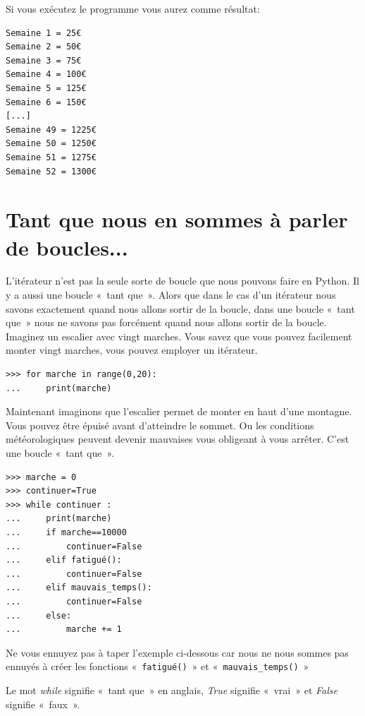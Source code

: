Si vous exécutez le programme vous aurez comme résultat:

\begin{Verbatim}[frame=single,rulecolor=\color{gray}, label=ne pas saisir]
Semaine 1 = 25€
Semaine 2 = 50€
Semaine 3 = 75€
Semaine 4 = 100€
Semaine 5 = 125€
Semaine 6 = 150€
[...]
Semaine 49 = 1225€
Semaine 50 = 1250€
Semaine 51 = 1275€
Semaine 52 = 1300€
\end{Verbatim}

\section{Tant que nous en sommes à parler de boucles...}

L'itérateur n'est pas la seule sorte de boucle que nous pouvons faire en Python.  Il y a aussi une boucle «~tant que~». Alors que dans le cas d'un itérateur nous savons exactement quand nous allons sortir de la boucle, dans une boucle «~tant que~» nous ne savons pas forcément quand nous allons sortir de la boucle.  Imaginez un escalier avec vingt marches. Vous savez que vous pouvez facilement monter vingt marches, vous pouvez employer un itérateur.

\begin{Verbatim}[frame=single,rulecolor=\color{gray}, label=ne pas saisir]
>>> for marche in range(0,20):
...     print(marche)
\end{Verbatim}

Maintenant imaginons que l'escalier permet de monter en haut d'une montagne. Vous pouvez être épuisé avant d'atteindre le sommet. Ou les conditions météorologiques peuvent devenir mauvaises vous obligeant à vous arrêter.
C'est une boucle «~tant que~».

\begin{Verbatim}[frame=single,rulecolor=\color{gray}, label=ne pas saisir]
>>> marche = 0
>>> continuer=True
>>> while continuer :
...     print(marche)
... 	if marche==10000
...         continuer=False
...     elif fatigué():
...         continuer=False
...     elif mauvais_temps():
...         continuer=False
...     else:
...         marche += 1
\end{Verbatim}

Ne vous ennuyez pas à taper l'exemple ci-dessous car nous ne nous sommes pas ennuyés à créer les fonctions «~\texttt{fatigué()}~» et «~\texttt{mauvais\_temps()}~» 

Le mot \emph{while} signifie «~tant que~» en anglais, \emph{True} signifie «~vrai~» et \emph{False} signifie «~faux~».

